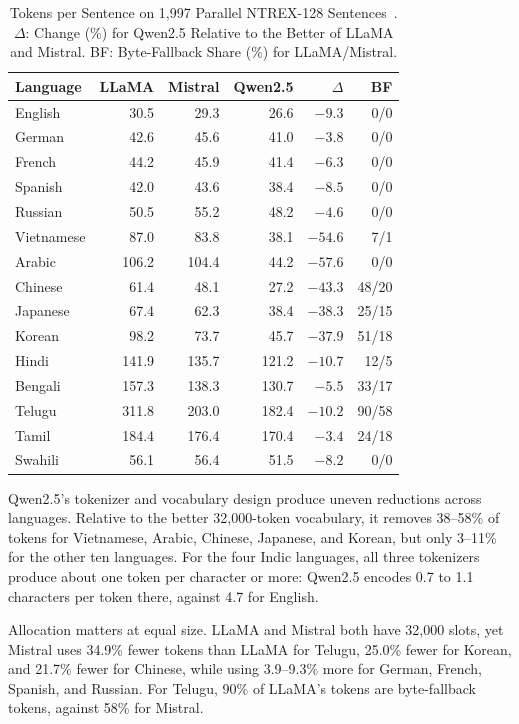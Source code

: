\documentclass[conference]{IEEEtran}
\begin{document}
\begin{table}[!t]
\caption{Tokens per Sentence on 1,997 Parallel NTREX-128 Sentences~\cite{ntrex}. $\Delta$: Change (\%) for Qwen2.5 Relative to the Better of LLaMA and Mistral. BF: Byte-Fallback Share (\%) for LLaMA/Mistral.}
\label{tab:tok}
\centering
\footnotesize
\setlength{\tabcolsep}{4pt}
\begin{tabular}{@{}lrrrrr@{}}
\toprule
\textbf{Language} & \textbf{LLaMA} & \textbf{Mistral} & \textbf{Qwen2.5} & $\Delta$ & \textbf{BF} \\
\midrule
English & 30.5 & 29.3 & 26.6 & $-9.3$ & 0/0 \\
German & 42.6 & 45.6 & 41.0 & $-3.8$ & 0/0 \\
French & 44.2 & 45.9 & 41.4 & $-6.3$ & 0/0 \\
Spanish & 42.0 & 43.6 & 38.4 & $-8.5$ & 0/0 \\
Russian & 50.5 & 55.2 & 48.2 & $-4.6$ & 0/0 \\
Vietnamese & 87.0 & 83.8 & 38.1 & $-54.6$ & 7/1 \\
Arabic & 106.2 & 104.4 & 44.2 & $-57.6$ & 0/0 \\
Chinese & 61.4 & 48.1 & 27.2 & $-43.3$ & 48/20 \\
Japanese & 67.4 & 62.3 & 38.4 & $-38.3$ & 25/15 \\
Korean & 98.2 & 73.7 & 45.7 & $-37.9$ & 51/18 \\
Hindi & 141.9 & 135.7 & 121.2 & $-10.7$ & 12/5 \\
Bengali & 157.3 & 138.3 & 130.7 & $-5.5$ & 33/17 \\
Telugu & 311.8 & 203.0 & 182.4 & $-10.2$ & 90/58 \\
Tamil & 184.4 & 176.4 & 170.4 & $-3.4$ & 24/18 \\
Swahili & 56.1 & 56.4 & 51.5 & $-8.2$ & 0/0 \\
\bottomrule
\end{tabular}
\end{table}

Qwen2.5's tokenizer and vocabulary design produce uneven reductions across languages. Relative to the better 32,000-token vocabulary, it removes 38--58\% of tokens for Vietnamese, Arabic, Chinese, Japanese, and Korean, but only 3--11\% for the other ten languages. For the four Indic languages, all three tokenizers produce about one token per character or more: Qwen2.5 encodes 0.7 to 1.1 characters per token there, against 4.7 for English.

Allocation matters at equal size. LLaMA and Mistral both have 32,000 slots, yet Mistral uses 34.9\% fewer tokens than LLaMA for Telugu, 25.0\% fewer for Korean, and 21.7\% fewer for Chinese, while using 3.9--9.3\% more for German, French, Spanish, and Russian. For Telugu, 90\% of LLaMA's tokens are byte-fallback tokens, against 58\% for Mistral.
\end{document}
